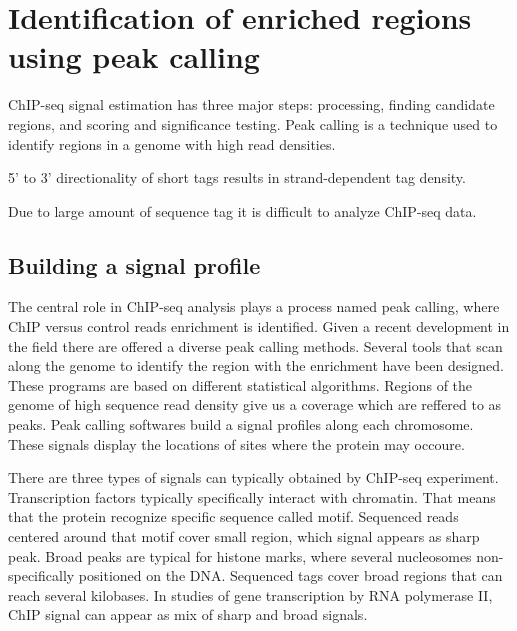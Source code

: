 \chapter{Identification of enriched regions using peak calling}

ChIP-seq signal estimation has three major steps: processing, finding candidate regions, and scoring and significance testing.
Peak calling is a technique used to identify regions in a genome with high read densities.

5' to 3' directionality of short tags results in strand-dependent tag density.

Due to large amount of sequence tag it is difficult to analyze ChIP-seq data.





\section{Building a signal profile}

The central role in ChIP-seq analysis plays a process named peak calling, where ChIP versus control reads enrichment is identified.
Given a recent development in the field there are offered a diverse peak calling methods.
Several tools that scan along the genome to identify the region with the enrichment have been designed.
These programs are based on different statistical algorithms.
Regions of the genome of high sequence read density give us a coverage which are reffered to as peaks.
Peak calling softwares build a signal profiles along each chromosome.
These signals display the locations of sites where the protein may occoure.

There are three types of signals can typically obtained by ChIP-seq experiment.
Transcription factors typically specifically interact with chromatin.
That means that the protein recognize specific sequence called motif.
Sequenced reads centered around that motif cover small region, which signal appears as sharp peak.
Broad peaks are typical for histone marks, where several nucleosomes non-specifically positioned on the DNA.
Sequenced tags cover broad regions that can reach several kilobases.
In studies of gene transcription by RNA polymerase II, ChIP signal can appear as mix of sharp and broad signals.

